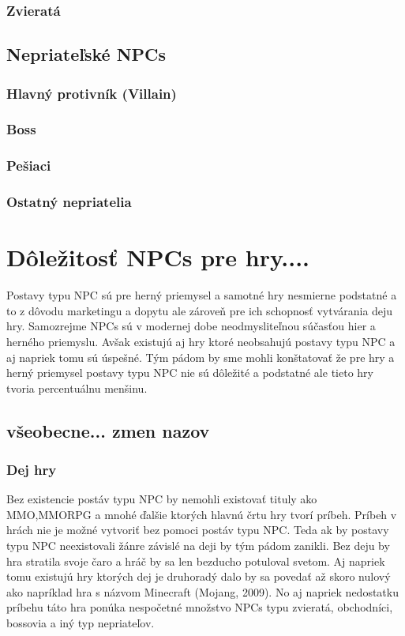 \documentclass[10pt,twoside,slovak,a4paper]{article}
\begin{document}
\subsubsection{Zvieratá}

\subsection{Nepriateľské NPCs} \label{enemy}

\subsubsection{Hlavný protivník (Villain)} \label{BOSS}

\subsubsection{Boss} \label{BOSS}

\subsubsection{Pešiaci} \label{Pesiaci}

\subsubsection{Ostatný nepriatelia} \label{Pesiaci}


\section{Dôležitosť NPCs pre hry....}   \label{Dolezitost}

Postavy typu NPC sú pre herný priemysel a samotné hry nesmierne podstatné a to z dôvodu marketingu a dopytu ale zároveň pre ich schopnosť vytvárania deju hry. Samozrejme NPCs sú v modernej dobe neodmysliteľnou súčasťou hier a herného priemyslu. Avšak existujú aj hry ktoré neobsahujú postavy typu NPC a aj napriek tomu sú úspešné. Tým pádom by sme mohli konštatovať že pre hry a herný priemysel postavy typu NPC nie sú dôležité a podstatné ale tieto hry tvoria percentuálnu menšinu.%

\subsection{všeobecne... zmen nazov}

\subsubsection{Dej hry}
Bez existencie postáv typu NPC by nemohli existovať tituly ako MMO,MMORPG a mnohé ďalšie 
ktorých hlavnú črtu hry tvorí príbeh. Príbeh v hrách nie je možné vytvoriť bez pomoci postáv typu NPC. 
Teda ak by postavy typu NPC neexistovali žánre závislé na deji by tým pádom zanikli. 
Bez deju by hra stratila svoje čaro a hráč by sa len bezducho potuloval svetom. Aj napriek tomu 
existujú hry ktorých dej je druhoradý dalo by sa povedať až skoro nulový ako 
napríklad hra s názvom Minecraft (Mojang, 2009). No aj napriek nedostatku príbehu 
táto hra ponúka nespočetné množstvo NPCs typu zvieratá, obchodníci, bossovia a iný typ nepriateľov.
\end{document}
